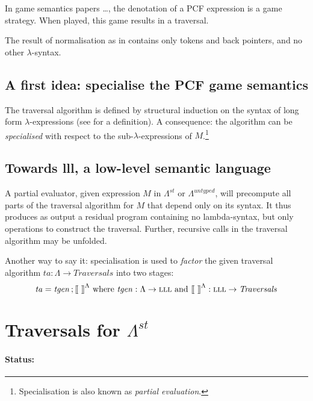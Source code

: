 \documentclass{llncs}
\begin{document}
In game semantics papers \cite{ong2015}\ldots, the denotation of a PCF expression is  a game strategy. When played, 
this game results in a traversal.

The result of normalisation as in \cite{ong2015} contains only tokens and back pointers, and no other  $\lambda$-syntax.



\subsection{A first  idea: specialise the PCF game semantics}



The traversal algorithm is defined by structural induction on the syntax of long form $\lambda$-expressions
(see \cite{ong2015} for a definition). 
A consequence: the algorithm can be {\em specialised} with respect to the sub-$\lambda$-expressions of 
$M$.\footnote{Specialisation is also known as {\em partial evaluation}.}



\subsection{Towards {\sc lll}, a low-level semantic language}



A partial evaluator, given expression $M$ in $\Lambda^{st}$ or $\Lambda^{untyped}$, will precompute all parts of the traversal algorithm for $M$ that depend only on its syntax. It thus produces as output a residual program containing no lambda-syntax, but only operations to construct the traversal. Further, recursive calls in the traversal algorithm may be unfolded.

Another way to say it: specialisation is used to {\em factor} the given traversal algorithm
$ \mathit{ta} : \Lambda \to \mathit{Traversals}$ into two stages:
$$
 \mathit{ta} = \mathit{tgen}\, ; \mbox{$\lbrack\hspace{-0.3ex}\lbrack$}\ \mbox{$\rbrack\hspace{-0.3ex}\rbrack$}^\Lambda 
 \mbox{\ where\  }  
       \mathit{tgen}:\Lambda \to \mbox{\sc lll} 
 \mbox{\ and\ }
 \mbox{$\lbrack\hspace{-0.3ex}\lbrack$}\ \mbox{$\rbrack\hspace{-0.3ex}\rbrack$}^\Lambda : \mbox{\sc lll} \to \mathit{Traversals}
$$

\section{Traversals for $\Lambda^{st}$}

\paragraph{Status:} \hfill
\end{document}
